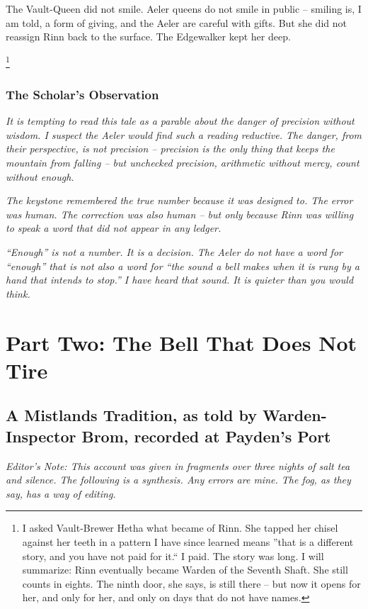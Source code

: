 \documentclass[12pt]{article}
\begin{document}
The Vault-Queen did not smile. Aeler queens do not smile in public -- smiling is, I am told, a form of giving, and the Aeler are careful with gifts. But she did not reassign Rinn back to the surface. The Edgewalker kept her deep.

\footnote{I asked Vault-Brewer Hetha what became of Rinn. She tapped her chisel against her teeth in a pattern I have since learned means ''that is a different story, and you have not paid for it.`` I paid. The story was long. I will summarize: Rinn eventually became Warden of the Seventh Shaft. She still counts in eights. The ninth door, she says, is still there -- but now it opens for her, and only for her, and only on days that do not have names.}

\subsubsection{The Scholar's Observation}
\textit{It is tempting to read this tale as a parable about the danger of precision without wisdom. I suspect the Aeler would find such a reading reductive. The danger, from their perspective, is not precision -- precision is the only thing that keeps the mountain from falling -- but \textit{unchecked} precision, arithmetic without mercy, count without enough.}

\textit{The keystone remembered the true number because it was designed to. The error was human. The correction was also human -- but only because Rinn was willing to speak a word that did not appear in any ledger.}

\textit{``Enough'' is not a number. It is a decision. The Aeler do not have a word for ``enough'' that is not also a word for ``the sound a bell makes when it is rung by a hand that intends to stop.'' I have heard that sound. It is quieter than you would think.}

\section{Part Two: The Bell That Does Not Tire}
\subsection{A Mistlands Tradition, as told by Warden-Inspector Brom, recorded at Payden's Port}
\emph{Editor's Note: This account was given in fragments over three nights of salt tea and silence. The following is a synthesis. Any errors are mine. The fog, as they say, has a way of editing.}
\end{document}
